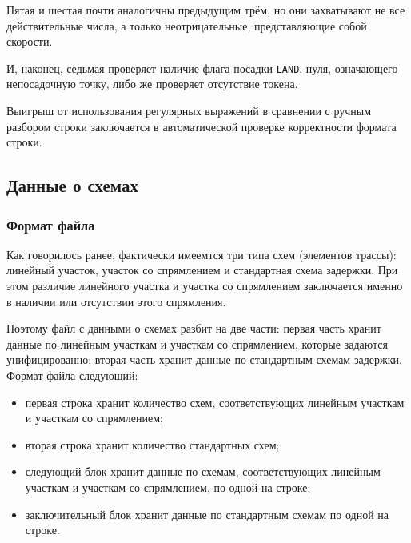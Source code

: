 \documentclass[12pt]{article}
\theoremstyle{plain}
\begin{document}
Пятая и шестая почти аналогичны предыдущим трём, но они захватывают не все действительные числа, а только неотрицательные, представляющие собой скорости.

И, наконец, седьмая проверяет наличие флага посадки \texttt{LAND}, нуля, означающего непосадочную точку, либо же проверяет отсутствие токена. 

Выигрыш от использования регулярных выражений в сравнении с ручным разбором строки заключается в автоматической проверке корректности формата строки.


\subsection{Данные о схемах}

\subsubsection{Формат файла}

Как говорилось ранее, фактически имеемтся три типа схем (элементов трассы): линейный участок, участок со спрямлением и стандартная схема задержки. При этом различие линейного участка и участка со спрямлением заключается именно в наличии или отсутствии этого спрямления. 

Поэтому файл с данными о схемах разбит на две части: первая часть хранит данные по линейным участкам и участкам со спрямлением, которые задаются унифицированно; вторая часть хранит данные по стандартным схемам задержки. Формат файла следующий:

\begin{itemize}[topsep=-0.5\parsep,itemsep=-0.5\parsep]
  \item первая строка хранит количество схем, соответствующих линейным участкам и участкам со спрямлением;
  \item вторая строка хранит количество стандартных схем;
  \item следующий блок хранит данные по схемам, соответствующих линейным участкам и участкам со спрямлением, по одной на строке;
  \item заключительный блок хранит данные по стандартным схемам по одной на строке.
\end{itemize}
\end{document}
